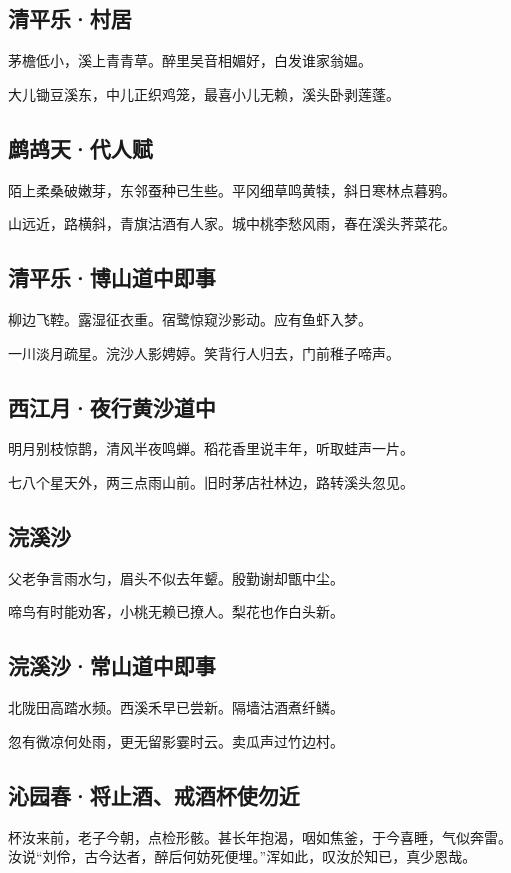 \documentclass[a5paper]{ctexart}
\begin{document}
	\subsection{清平乐·村居}
	茅檐低小，溪上青青草。醉里吴音相媚好，白发谁家翁媪。
	
	大儿锄豆溪东，中儿正织鸡笼，最喜小儿无赖，溪头卧剥莲蓬。
	
	\subsection{鹧鸪天·代人赋}
	陌上柔桑破嫩芽，东邻蚕种已生些。平冈细草鸣黄犊，斜日寒林点暮鸦。
	
	山远近，路横斜，青旗沽酒有人家。城中桃李愁风雨，春在溪头荠菜花。
	
	\subsection{清平乐·博山道中即事}
	柳边飞鞚。露湿征衣重。宿鹭惊窥沙影动。应有鱼虾入梦。
	
	一川淡月疏星。浣沙人影娉婷。笑背行人归去，门前稚子啼声。
	
	\subsection{西江月·夜行黄沙道中}
	明月别枝惊鹊，清风半夜鸣蝉。稻花香里说丰年，听取蛙声一片。
	
	七八个星天外，两三点雨山前。旧时茅店社林边，路转溪头忽见。
	
	\subsection{浣溪沙}
	父老争言雨水匀，眉头不似去年颦。殷勤谢却甑中尘。
	
	啼鸟有时能劝客，小桃无赖已撩人。梨花也作白头新。
	
	\subsection{浣溪沙·常山道中即事}
	北陇田高踏水频。西溪禾早已尝新。隔墙沽酒煮纤鳞。
	
	忽有微凉何处雨，更无留影霎时云。卖瓜声过竹边村。
	
	\subsection{沁园春·将止酒、戒酒杯使勿近}
	杯汝来前，老子今朝，点检形骸。甚长年抱渴，咽如焦釜，于今喜睡，气似奔雷。汝说“刘伶，古今达者，醉后何妨死便埋。”浑如此，叹汝於知已，真少恩哉。
	
\end{document}

